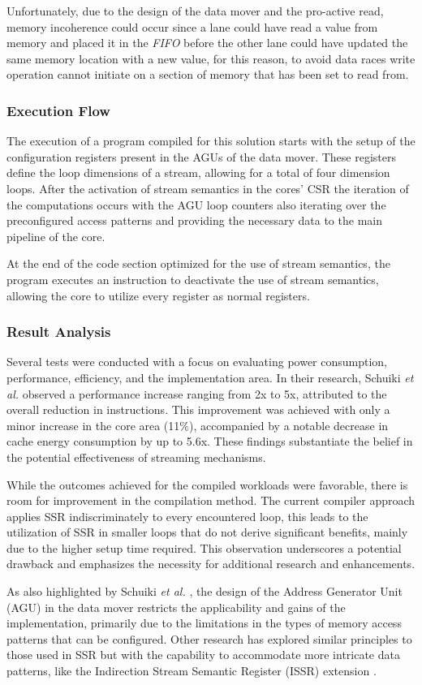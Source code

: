 Unfortunately, due to the design of the data mover and the pro-active read, memory incoherence could occur since a lane could have read a value from memory and placed it in the \textit{FIFO} before the other lane could have updated the same memory location with a new value, for this reason, to avoid data races write operation cannot initiate on a section of memory that has been set to read from.

\subsubsection{Execution Flow}

The execution of a program compiled for this solution starts with the setup of the configuration registers present in the AGUs of the data mover. These registers define the loop dimensions of a stream, allowing for a total of four dimension loops. After the activation of stream semantics in the cores' CSR the iteration of the computations occurs with the AGU loop counters also iterating over the preconfigured access patterns and providing the necessary data to the main pipeline of the core.

At the end of the code section optimized for the use of stream semantics, the program executes an instruction to deactivate the use of stream semantics, allowing the core to utilize every register as normal registers.

\subsubsection{Result Analysis}


Several tests were conducted with a focus on evaluating power consumption, performance, efficiency, and the implementation area. In their research, Schuiki \textit{et al.} \cite{9068465} observed a performance increase ranging from 2x to 5x, attributed to the overall reduction in instructions. This improvement was achieved with only a minor increase in the core area (11\%), accompanied by a notable decrease in cache energy consumption by up to 5.6x. These findings substantiate the belief in the potential effectiveness of streaming mechanisms.

While the outcomes achieved for the compiled workloads were favorable, there is room for improvement in the compilation method. The current compiler approach applies SSR indiscriminately to every encountered loop, this leads to the utilization of SSR in smaller loops that do not derive significant benefits, mainly due to the higher setup time required. This observation underscores a potential drawback and emphasizes the necessity for additional research and enhancements.

As also highlighted by Schuiki \textit{et al.} \cite{9068465}, the design of the Address Generator Unit (AGU) in the data mover restricts the applicability and gains of the implementation, primarily due to the limitations in the types of memory access patterns that can be configured. Other research has explored similar principles to those used in SSR but with the capability to accommodate more intricate data patterns, like the Indirection Stream Semantic Register (ISSR) extension \cite{9474230}.


